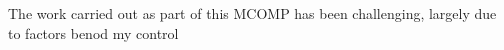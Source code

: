 
The work carried out as part of this MCOMP has been challenging, largely due to factors benod my control